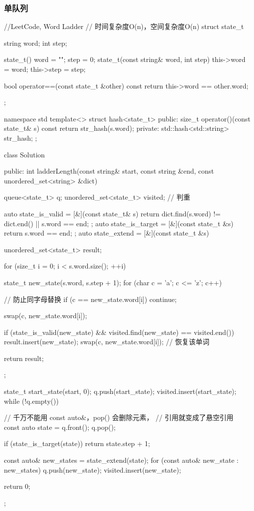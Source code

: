 \subsubsection{单队列}
\begin{Code}
//LeetCode, Word Ladder
// 时间复杂度O(n)，空间复杂度O(n)
struct state_t {
    string word;
    int step;

    state_t() { word = ""; step = 0; }
    state_t(const string& word, int step) {
        this->word = word;
        this->step = step;
    }

    bool operator==(const state_t &other) const {
        return this->word == other.word;
    }
};

namespace std {
    template<> struct hash<state_t> {
    public:
        size_t operator()(const state_t& s) const {
            return str_hash(s.word);
        }
    private:
        std::hash<std::string> str_hash;
    };
}


class Solution {
public:
    int ladderLength(const string& start, const string &end,
            const unordered_set<string> &dict) {
        queue<state_t> q;
        unordered_set<state_t> visited;  // 判重

        auto state_is_valid = [&](const state_t& s) {
            return dict.find(s.word) != dict.end() || s.word == end;
        };
        auto state_is_target = [&](const state_t &s) {return s.word == end; };
        auto state_extend = [&](const state_t &s) {
            unordered_set<state_t> result;

            for (size_t i = 0; i < s.word.size(); ++i) {
                state_t new_state(s.word, s.step + 1);
                for (char c = 'a'; c <= 'z'; c++) {
                    // 防止同字母替换
                    if (c == new_state.word[i]) continue;

                    swap(c, new_state.word[i]);

                    if (state_is_valid(new_state) &&
                        visited.find(new_state) == visited.end()) {
                        result.insert(new_state);
                    }
                    swap(c, new_state.word[i]); // 恢复该单词
                }
            }

            return result;
        };

        state_t start_state(start, 0);
        q.push(start_state);
        visited.insert(start_state);
        while (!q.empty()) {
            // 千万不能用 const auto&，pop() 会删除元素，
            // 引用就变成了悬空引用
            const auto state = q.front();
            q.pop();

            if (state_is_target(state)) {
                return state.step + 1;
            }

            const auto& new_states = state_extend(state);
            for (const auto& new_state : new_states) {
                q.push(new_state);
                visited.insert(new_state);
            }
        }
        return 0;
    }
};
\end{Code}


